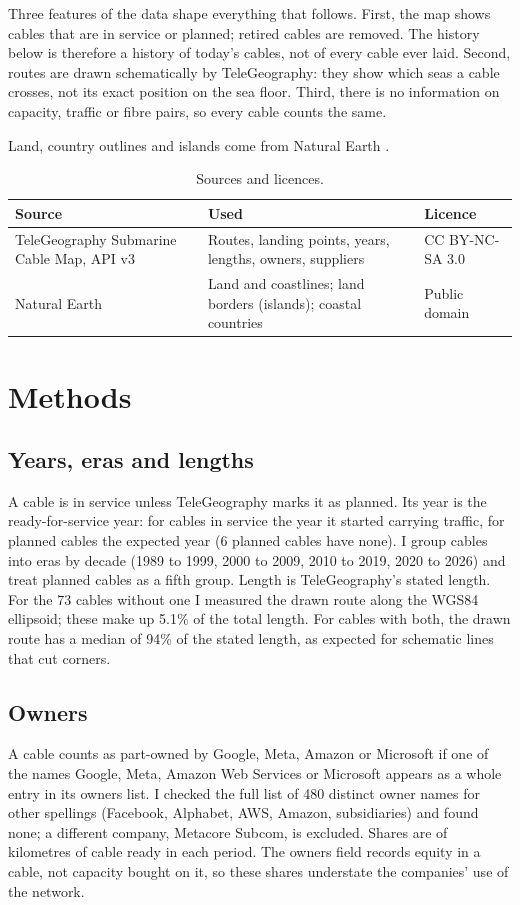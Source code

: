\documentclass[11pt,a4paper]{article}
\begin{document}
Three features of the data shape everything that follows. First, the map shows cables that are in service or planned; retired cables are removed. The history below is therefore a history of today's cables, not of every cable ever laid. Second, routes are drawn schematically by TeleGeography: they show which seas a cable crosses, not its exact position on the sea floor. Third, there is no information on capacity, traffic or fibre pairs, so every cable counts the same.

Land, country outlines and islands come from Natural Earth \citep{naturalearth}.

\begin{table}[tbp]\centering\small\caption{Sources and licences.}\label{tab:sources}
\begin{tabular}{>{\raggedright\arraybackslash}p{4cm}>{\raggedright\arraybackslash}p{7.2cm}>{\raggedright\arraybackslash}p{3.2cm}}\toprule Source & Used & Licence\\\midrule
TeleGeography Submarine Cable Map, API v3 & Routes, landing points, years, lengths, owners, suppliers & CC BY-NC-SA 3.0\\
Natural Earth & Land and coastlines; land borders (islands); coastal countries & Public domain\\
\bottomrule\end{tabular}\end{table}

\section{Methods}
\subsection{Years, eras and lengths}
A cable is in service unless TeleGeography marks it as planned. Its year is the ready-for-service year: for cables in service the year it started carrying traffic, for planned cables the expected year (6 planned cables have none). I group cables into eras by decade (1989 to 1999, 2000 to 2009, 2010 to 2019, 2020 to 2026) and treat planned cables as a fifth group. Length is TeleGeography's stated length. For the 73 cables without one I measured the drawn route along the WGS84 ellipsoid; these make up 5.1\% of the total length. For cables with both, the drawn route has a median of 94\% of the stated length, as expected for schematic lines that cut corners.

\subsection{Owners}
A cable counts as part-owned by Google, Meta, Amazon or Microsoft if one of the names Google, Meta, Amazon Web Services or Microsoft appears as a whole entry in its owners list. I checked the full list of 480 distinct owner names for other spellings (Facebook, Alphabet, AWS, Amazon, subsidiaries) and found none; a different company, Metacore Subcom, is excluded. Shares are of kilometres of cable ready in each period. The owners field records equity in a cable, not capacity bought on it, so these shares understate the companies' use of the network.
\end{document}
